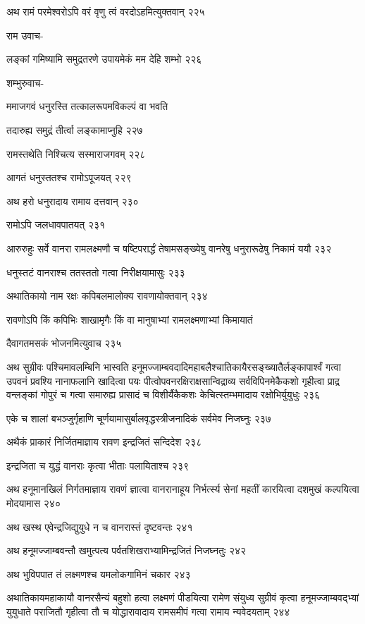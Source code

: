 अथ रामं परमेश्वरोऽपि वरं वृणु त्वं वरदोऽहमित्युक्तवान् २२५

राम उवाच-

लङ्कां गमिष्यामि समुद्रतरणे उपायमेकं मम देहि शम्भो २२६

शम्भुरुवाच-

ममाजगवं धनुरस्ति तत्कालरूपमविकल्पं वा भवति

तदारुह्य समुद्रं तीर्त्वा लङ्कामाप्नुहि २२७

रामस्तथेति निश्चित्य सस्माराजगवम् २२८

आगतं धनुस्ततश्च रामोऽपूजयत् २२९

अथ हरो धनुरादाय रामाय दत्तवान् २३०

रामोऽपि जलधावपातयत् २३१

आरुरुहुः सर्वे वानरा रामलक्ष्मणौ च षष्टिपरार्द्धं तेषामसङ्ख्येषु वानरेषु धनुरारूढेषु निकामं ययौ
 २३२

धनुस्तटं वानराश्च ततस्ततो गत्वा निरीक्षयामासुः २३३

अथातिकायो नाम रक्षः कपिबलमालोक्य रावणायोक्तवान् २३४

रावणोऽपि किं कपिभिः शाखामृगैः किं वा मानुषाभ्यां रामलक्ष्मणाभ्यां किमायातं

दैवागतमसकं भोजनमित्युवाच २३५

अथ सुग्रीवः पश्चिमावलम्बिनि भास्वति हनूमज्जाम्बवदादिमहाबलैश्चातिकायैरसङ्ख्यातैर्लङ्कापार्श्वं
गत्वा उपवनं प्रवश्यि नानाफलानि खादित्वा पयः पीत्वोपवनरक्षिराक्षसान्विद्राव्य
सर्वविपिनमेकैकशो गृहीत्वा प्राद्र वन्लङ्कां गोपुरं च गत्वा समारुह्य प्रासादं च विशीर्यैकैकशः
केचित्स्तम्भमादाय रक्षोभिर्युयुधुः २३६

एके च शालां बभञ्जुर्गृहाणि चूर्णयामासुर्बालवृद्धस्त्रीजनादिकं सर्वमेव निजघ्नुः २३७

अथैकं प्राकारं निर्जितमाज्ञाय रावण इन्द्रजितं सन्दिदेश २३८

इन्द्रजिता च युद्धं वानराः कृत्वा भीताः पलायिताश्च २३९

अथ हनूमानखिलं निर्गतमाज्ञाय रावणं ज्ञात्वा वानरानाहूय निर्भर्त्स्य सेनां महतीं कारयित्वा
दशमुखं कल्पयित्वा मोदयामास २४०

अथ खस्थ एवेन्द्रजिद्युयुधे न च वानरास्तं दृष्टवन्तः २४१

अथ हनूमज्जाम्बवन्तौ खमुत्पत्य पर्वतशिखराभ्यामिन्द्रजितं निजघ्नतुः २४२

अथ भुविपपात तं लक्ष्मणश्च यमलोकगामिनं चकार २४३

अथातिकायमहाकायौ वानरसैन्यं बहुशो हत्वा लक्ष्मणं पीडयित्वा रामेण संयुध्य सुग्रीवं कृत्वा
हनूमज्जाम्बवद्भ्यां युयुधाते पराजितौ गृहीत्वा तौ च योद्धारावादाय रामसमीपं गत्वा रामाय
न्यवेदयताम् २४४

